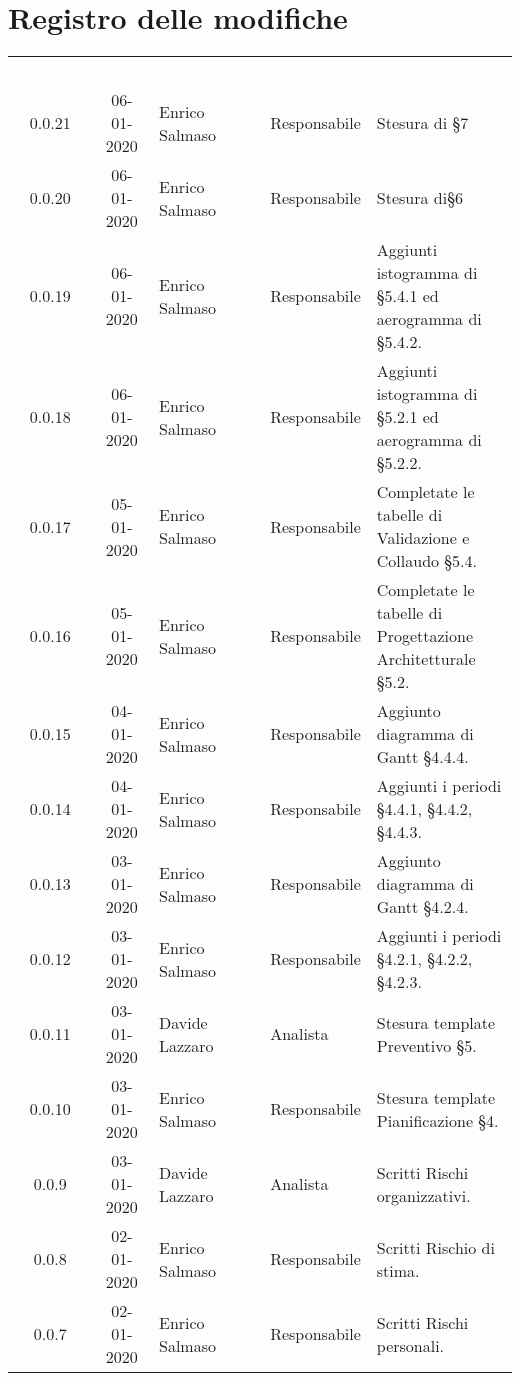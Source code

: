 \section*{Registro delle modifiche}
{
\renewcommand{\arraystretch}{1.5}
\centering
\begin{longtable}{ c c  C{4cm}  C{3cm} C{4cm}}
\textcolor{white}{\textbf{Versione}} & \textcolor{white}{\textbf{Data}} & \textcolor{white}{\textbf{Nominativo}} & \textcolor{white}{\textbf{Ruolo}} & \textcolor{white}{\textbf{Descrizione}}\\	


0.0.21 & 06-01-2020 & Enrico Salmaso & Responsabile & Stesura di §7\\
0.0.20 & 06-01-2020 & Enrico Salmaso & Responsabile & Stesura di§6\\
0.0.19 & 06-01-2020 & Enrico Salmaso & Responsabile & Aggiunti istogramma di §5.4.1 ed aerogramma di §5.4.2.\\
0.0.18 & 06-01-2020 & Enrico Salmaso & Responsabile & Aggiunti istogramma di §5.2.1 ed aerogramma di §5.2.2.\\
0.0.17 & 05-01-2020 & Enrico Salmaso & Responsabile & Completate le tabelle di Validazione e Collaudo §5.4.\\
0.0.16 & 05-01-2020 & Enrico Salmaso & Responsabile & Completate le tabelle di Progettazione Architetturale §5.2.\\
0.0.15 & 04-01-2020 & Enrico Salmaso & Responsabile & Aggiunto diagramma di Gantt §4.4.4. \\
0.0.14 & 04-01-2020 & Enrico Salmaso & Responsabile & Aggiunti i periodi §4.4.1, §4.4.2, §4.4.3.\\
0.0.13 & 03-01-2020 & Enrico Salmaso & Responsabile & Aggiunto diagramma di Gantt §4.2.4.\\
0.0.12 & 03-01-2020 & Enrico Salmaso & Responsabile & Aggiunti i periodi §4.2.1, §4.2.2, §4.2.3.\\
0.0.11 & 03-01-2020 & Davide Lazzaro & Analista & Stesura template Preventivo §5.\\
0.0.10 & 03-01-2020 & Enrico Salmaso & Responsabile & Stesura template Pianificazione §4.\\
0.0.9 & 03-01-2020 & Davide Lazzaro & Analista & Scritti Rischi organizzativi. \\
0.0.8 & 02-01-2020 & Enrico Salmaso & Responsabile & Scritti Rischio di stima. \\
0.0.7 & 02-01-2020 & Enrico Salmaso & Responsabile & Scritti Rischi personali. \\

\end{longtable}}
